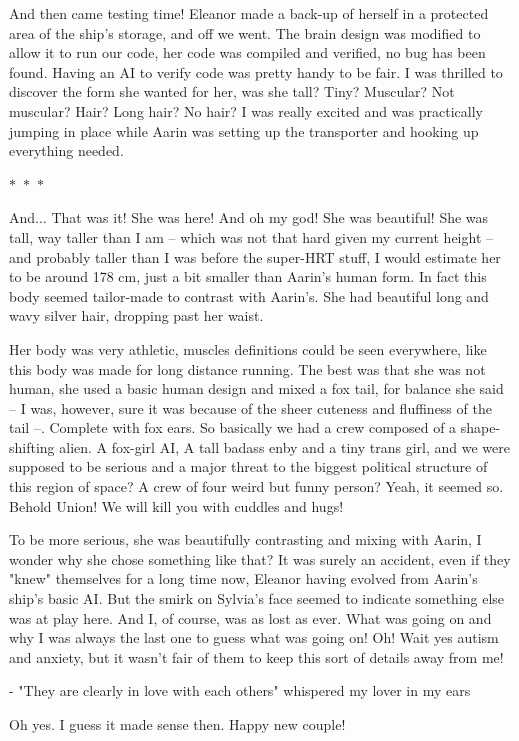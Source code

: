 \documentclass[colorlinks,12pt,a4paper]{book}
\newcommand\sep{\begin{center}
  \boldmath $\ast$~$\ast$~$\ast$
\end{center}}
\begin{document}
 And then came testing time! Eleanor made a back-up of herself in a protected area of the ship's storage, and off we went. The brain design was modified to allow it 
 to run our code, her code was compiled and verified, no bug has been found. Having an AI to verify code was pretty handy to be fair. I was thrilled to discover 
 the form she wanted for her, was she tall? Tiny? Muscular? Not muscular? Hair? Long hair? No hair? I was really excited and was practically jumping in place while 
 Aarin was setting up the transporter and hooking up everything needed.
 
 \sep 
 
 And... That was it! She was here! And oh my god! She was beautiful! She was tall, way taller than I am -- which was not that hard given my current height -- and probably 
 taller than I was before the super-HRT stuff, I would estimate her to be around 178 cm, just a bit smaller than Aarin's human form. In fact this body seemed tailor-made 
 to contrast with Aarin's. She had beautiful long and wavy silver hair, dropping past her waist. \par
 \bigskip  
 
 
 Her body was very athletic, muscles definitions could be seen everywhere,
 like this body was made for long distance running. The best was that she was not human, she used a basic human design and mixed a fox tail, for balance she said -- I was, however, 
 sure it was because of the sheer cuteness and fluffiness of the tail --. Complete with fox ears. So basically we had a crew composed of a shape-shifting alien. A 
 fox-girl AI, A tall badass enby and a tiny trans girl, and we were supposed to be serious and a major threat to the biggest political structure of this region of space? 
 A crew of four weird but funny person? Yeah, it seemed so. Behold Union! We will kill you with cuddles and hugs!\par 
 \bigskip 
 
 To be more serious, she was beautifully contrasting and mixing with Aarin, I wonder why she chose something like that? It was surely an 
 accident, even if they "knew" themselves for a long time now, Eleanor having evolved from Aarin's ship's basic AI. But the smirk on Sylvia's face 
 seemed to indicate something else was at play here. And I, of course, was as lost as ever. What was going on and why I was always the last one to 
 guess what was going on! Oh! Wait yes autism and anxiety, but it wasn't fair of them to keep this sort of details away from me!\par 
 \bigskip 
 
 - "They are clearly in love with each others" whispered my lover in my ears\par 
 \bigskip
 Oh yes. I guess it made sense then. Happy new couple!
 

\printglossaries
\end{document}
